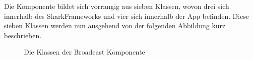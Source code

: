 \label{ch:broadcastoverview}
Die Komponente bildet sich vorrangig aus sieben Klassen, wovon drei sich innerhalb des SharkFrameworks und vier sich innerhalb der App befinden. Diese sieben Klassen werden nun ausgehend von der folgenden Abbildung kurz beschrieben.
\begin{figure}[H]
	\centering
	\hspace*{1cm}
	\caption{Die Klassen der Broadcast Komponente}
	\label{fig:broadcastStructure}
\end{figure}
